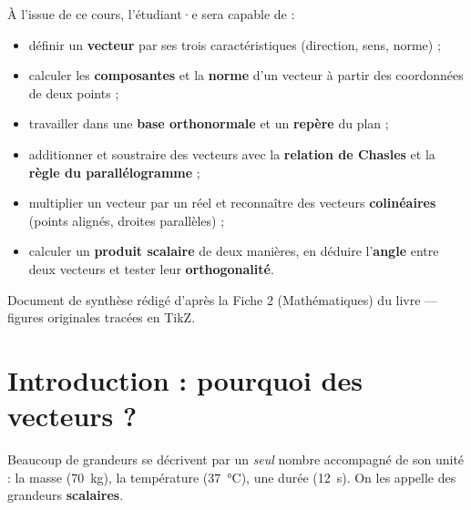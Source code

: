 \documentclass[11pt,a4paper]{article}
\begin{document}
\begin{tcolorbox}[boxbase,colback=primary!5,colframe=primary,width=15cm,
    title={\textsc{Objectifs pédagogiques de la fiche}}]
À l'issue de ce cours, l'étudiant·e sera capable de :
\begin{itemize}[leftmargin=1.6em,topsep=2pt,itemsep=1pt]
  \item définir un \textbf{vecteur} par ses trois caractéristiques (direction, sens, norme) ;
  \item calculer les \textbf{composantes} et la \textbf{norme} d'un vecteur à partir des coordonnées de deux points ;
  \item travailler dans une \textbf{base orthonormale} et un \textbf{repère} du plan ;
  \item additionner et soustraire des vecteurs avec la \textbf{relation de Chasles} et la \textbf{règle du parallélogramme} ;
  \item multiplier un vecteur par un réel et reconnaître des vecteurs \textbf{colinéaires} (points alignés, droites parallèles) ;
  \item calculer un \textbf{produit scalaire} de deux manières, en déduire l'\textbf{angle} entre deux vecteurs et tester leur \textbf{orthogonalité}.
\end{itemize}
\end{tcolorbox}

\vspace{0.4cm}
{\small\color{black!60} Document de synthèse rédigé d'après la Fiche 2 (Mathématiques) du livre — figures originales tracées en TikZ.}
\par
\endgroup

\newpage
\renewcommand{\contentsname}{\textcolor{primarydark}{Table des matières}}
\tableofcontents
\thispagestyle{fancy}
\newpage

\section{Introduction : pourquoi des vecteurs ?}
Beaucoup de grandeurs se décrivent par un \emph{seul} nombre accompagné de son unité : la masse
(\qty{70}{\kg}), la température (\qty{37}{\celsius}), une durée (\qty{12}{\s}). On les appelle des
grandeurs \textbf{scalaires}.
\end{document}
